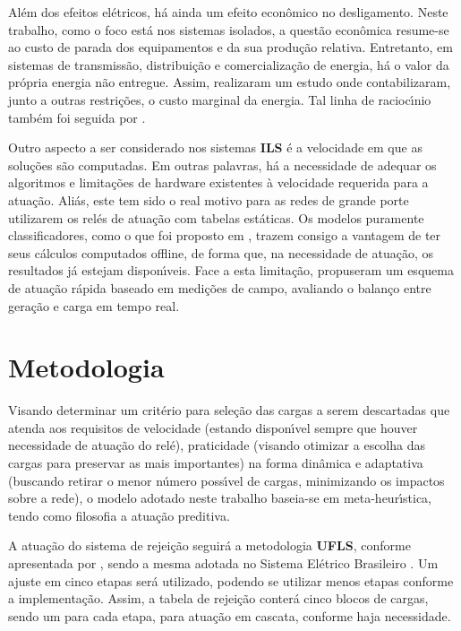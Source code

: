 Al{\'e}m dos efeitos el{\'e}tricos, h{\'a} ainda um efeito econ{\^o}mico no desligamento. Neste trabalho, como o foco est{\'a} nos sistemas isolados, a quest{\~a}o econ{\^o}mica resume-se ao custo de parada dos equipamentos e da sua produ{\c c}{\~a}o relativa. Entretanto, em sistemas de transmiss{\~a}o, distribui{\c c}{\~a}o e comercializa{\c c}{\~a}o de energia, h{\'a} o valor da pr{\'o}pria energia n{\~a}o entregue. Assim, \citeauthor{tikdari2015} realizaram um estudo onde contabilizaram, junto a outras restri{\c c}{\~o}es, o custo marginal da energia. Tal linha de racioc{\'\i}nio tamb{\'e}m foi seguida por \citeauthor{paul2017}.

Outro aspecto a ser considerado nos sistemas \textbf{ILS} {\'e} a velocidade em que as solu{\c c}{\~o}es s{\~a}o computadas. Em outras palavras, h{\'a} a necessidade de adequar os algoritmos e limita{\c c}{\~o}es de hardware existentes {\`a} velocidade requerida para a atua{\c c}{\~a}o. Ali{\'a}s, este tem sido o real motivo para as redes de grande porte utilizarem os rel{\'e}s de atua{\c c}{\~a}o com tabelas est{\'a}ticas. Os modelos puramente classificadores, como o que foi proposto em \cite{B574}, trazem consigo a vantagem de ter seus c{\'a}lculos computados offline, de forma que, na necessidade de atua{\c c}{\~a}o, os resultados j{\'a} estejam dispon{\'\i}veis. Face a esta limita{\c c}{\~a}o, \citeauthor{wester2014} propuseram um esquema de atua{\c c}{\~a}o r{\'a}pida baseado em medi{\c c}{\~o}es de campo, avaliando o balan{\c c}o entre gera{\c c}{\~a}o e carga em tempo real.

\chapter{Metodologia} \label{cap:metod}

Visando determinar um crit{\'e}rio para sele{\c c}{\~a}o das cargas a serem descartadas que atenda aos requisitos de velocidade (estando dispon{\'\i}vel sempre que houver necessidade de atua{\c c}{\~a}o do rel{\'e}), praticidade (visando otimizar a escolha das cargas para preservar as mais importantes) na forma din{\^a}mica e adaptativa (buscando retirar o menor n{\'u}mero poss{\'\i}vel de cargas, minimizando os impactos sobre a rede), o modelo adotado neste trabalho baseia-se em meta-heur{\'\i}stica, tendo como filosofia a atua{\c c}{\~a}o preditiva.

A atua{\c c}{\~a}o do sistema de rejei{\c c}{\~a}o seguir{\'a} a metodologia \textbf{UFLS}, conforme apresentada por \citeauthor{amelirole}, sendo a mesma adotada no Sistema El{\'e}trico Brasileiro \cite{aneel2015}. Um ajuste em cinco etapas ser{\'a} utilizado, podendo se utilizar menos etapas conforme a implementa{\c c}{\~a}o. Assim, a tabela de rejei{\c c}{\~a}o conter{\'a} cinco blocos de cargas, sendo um para cada etapa, para atua{\c c}{\~a}o em cascata, conforme haja necessidade.

